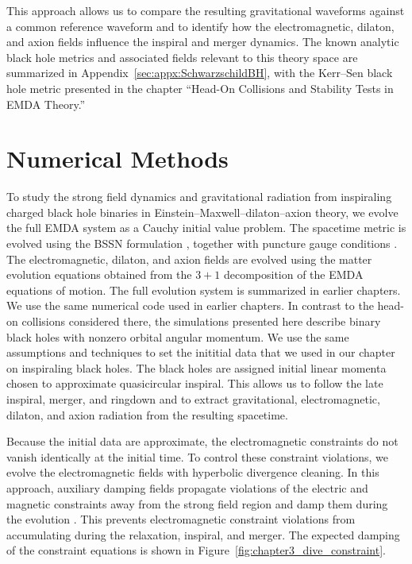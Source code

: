 This approach allows us to compare the resulting gravitational waveforms against a common reference waveform and to identify how the electromagnetic, dilaton, and axion fields influence the inspiral and merger dynamics. The known analytic black hole metrics and associated fields relevant to this theory space are summarized in Appendix~\ref{sec:appx:SchwarzschildBH}, with the Kerr--Sen black hole metric presented in the chapter ``Head-On Collisions and Stability Tests in EMDA Theory.''

\section{Numerical Methods}

To study the strong field dynamics and gravitational radiation from inspiraling charged black hole binaries in Einstein--Maxwell--dilaton--axion theory, we evolve the full EMDA system as a Cauchy initial value problem. The spacetime metric is evolved using the BSSN formulation \cite{Shibata1995_BSSN,Baumgarte1999_BSSN,Baumgarte2010}, together with puncture gauge conditions \cite{Campanelli2006,Baker2006}. The electromagnetic, dilaton, and axion fields are evolved using the matter evolution equations obtained from the $3+1$ decomposition of the EMDA equations of motion. The full evolution system is summarized in earlier chapters.
We use the same numerical code used in earlier chapters. In contrast to the head-on collisions considered there, the simulations presented here describe binary black holes with nonzero orbital angular momentum. We use the same assumptions and techniques to set the inititial data that we used in our chapter on inspiraling black holes. The black holes are assigned initial linear momenta chosen to approximate quasicircular inspiral. This allows us to follow the late inspiral, merger, and ringdown and to extract gravitational, electromagnetic, dilaton, and axion radiation from the resulting spacetime.

Because the initial data are approximate, the electromagnetic constraints do not vanish identically at the initial time. To control these constraint violations, we evolve the electromagnetic fields with hyperbolic divergence cleaning. In this approach, auxiliary damping fields propagate violations of the electric and magnetic constraints away from the strong field region and damp them during the evolution \cite{Palenzuela2009}. This prevents electromagnetic constraint violations from accumulating during the relaxation, inspiral, and merger. The expected damping of the constraint equations is shown in Figure~\ref{fig:chapter3_dive_constraint}.  

